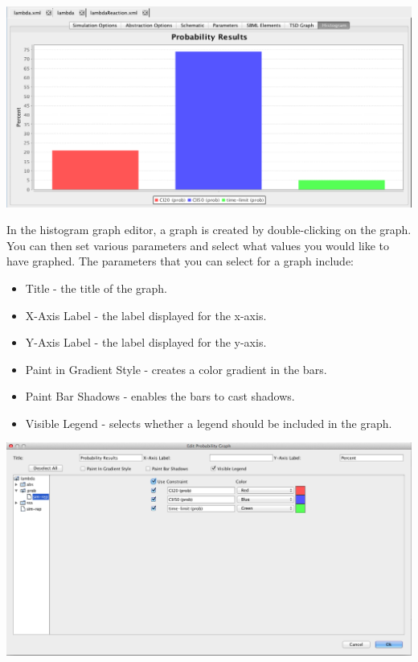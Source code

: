 \documentclass[titlepage,11pt]{article}
\begin{document}
\begin{center} 
\includegraphics[width=160mm]{screenshots/probResults}
\end{center}

In the histogram graph editor, a graph is created by double-clicking on the graph. You can then set various parameters and select what values you would like to have graphed. The parameters that you can select for a graph include: 
\begin{itemize}
\item Title - the title of the graph.
\item X-Axis Label - the label displayed for the x-axis. 
\item Y-Axis Label - the label displayed for the y-axis. 
\item Paint in Gradient Style - creates a color gradient in the bars.
\item Paint Bar Shadows - enables the bars to cast shadows.
\item Visible Legend - selects whether a legend should be included in the graph.
\end{itemize}

\begin{center}
\includegraphics[width=160mm]{screenshots/editProbGraph}
\end{center}
\end{document}
